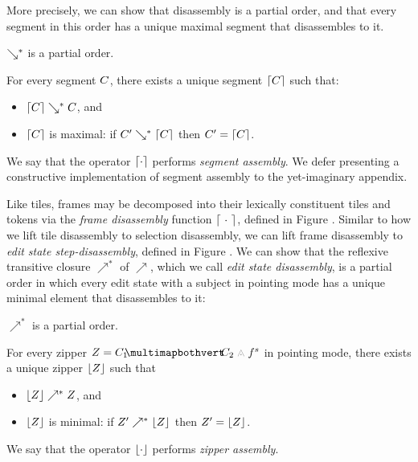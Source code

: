 More precisely, we can show that disassembly is a
partial order, and that every segment in this order
has a unique maximal segment that disassembles to it.
\begin{lemma}
  $\searrow^*$ is a partial order.
\end{lemma}
\begin{lemma}\label{lemma:unique-parsed-selection}
  For every segment $C$, there exists a unique
  segment $\left\lceil C\right\rceil$ such that:
  \begin{itemize}
  \item $\left\lceil C\right\rceil\searrow^*C$, and
  \item $\left\lceil C\right\rceil$ is maximal: if $C'\searrow^*\left\lceil C\right\rceil$ then $C' = \left\lceil C\right\rceil$.
  \end{itemize}
\end{lemma}
\noindent
We say that the operator $\left\lceil\cdot\right\rceil$ performs \emph{segment assembly}.
We defer presenting a constructive implementation of segment
assembly to the yet-imaginary appendix.


Like tiles, frames may be decomposed into their
lexically constituent tiles and tokens via the
\emph{frame disassembly} function $\left\lceil~\cdot~\right\rceil$,
defined in Figure .
Similar to how we lift tile disassembly to selection
disassembly, we can lift frame disassembly to
\emph{edit state step-disassembly}, defined in Figure .
We can show that the reflexive transitive closure
$\nearrow^*$ of $\nearrow$, which we call \emph{edit state disassembly},
is a partial order in
which every edit state with a subject in pointing mode
has a unique minimal element that disassembles to it:
\begin{lemma}
  $\nearrow^*$ is a partial order.
\end{lemma}
\begin{lemma}\label{lemma:unique-parsed-editstate}
  For every zipper $\editState = \zipper{\pointing{\selection_1}{\selection_2}}{\tfrelem^s}$
  in pointing mode,
  there exists a unique zipper $\left\lfloor Z\right\rfloor$ such that
  \begin{itemize}
  \item $\left\lfloor Z\right\rfloor \nearrow^* Z$, and
  \item $\left\lfloor Z\right\rfloor$ is minimal: if $Z' \nearrow^* \left\lfloor Z\right\rfloor$ then $Z' = \left\lfloor Z\right\rfloor$.
  \end{itemize}
\end{lemma}
\noindent
We say that the operator $\left\lfloor\cdot\right\rfloor$ performs \emph{zipper assembly}.

